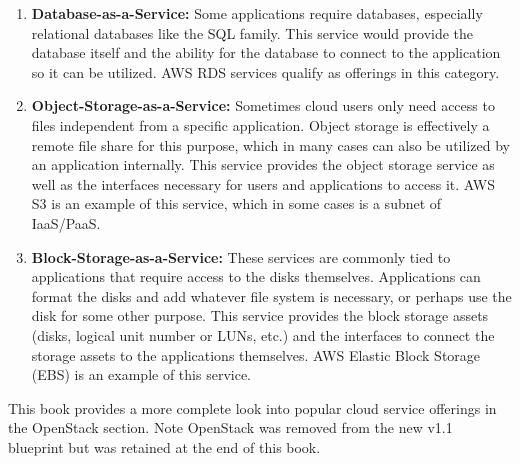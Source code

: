 \begin{enumerate}
  \item \textbf{Database-as-a-Service:} Some applications require databases,
  especially relational databases like the SQL family. This service would
  provide the database itself and the ability for the database to connect to
  the application so it can be utilized. AWS RDS services qualify as offerings
  in this category.
  \item \textbf{Object-Storage-as-a-Service:} Sometimes cloud users only need
  access to files independent from a specific application. Object storage is
  effectively a remote file share for this purpose, which in many cases can
  also be utilized by an application internally. This service provides the
  object storage service as well as the interfaces necessary for users
  and applications to access it. AWS S3 is an example of this service, which
  in some cases is a subnet of IaaS/PaaS.
  \item \textbf{Block-Storage-as-a-Service:} These services are commonly tied to
  applications that require access to the disks themselves. Applications can
  format the disks and add whatever file system is necessary, or perhaps use
  the disk for some other purpose. This service provides the block storage
  assets (disks, logical unit number or LUNs, etc.) and the interfaces to
  connect the storage assets to the applications themselves. AWS Elastic Block
  Storage (EBS) is an example of this service.
\end{enumerate}

This book provides a more complete look into popular cloud service offerings
in the OpenStack section. Note OpenStack was removed from the new v1.1
blueprint but was retained at the end of this book.
